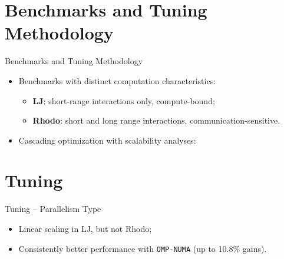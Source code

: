 \documentclass[aspectratio=169, handout]{beamer}
\begin{document}
\section{Benchmarks and Tuning Methodology}

\begin{frame}{Benchmarks and Tuning Methodology}

    \begin{itemize}
        \item Benchmarks with distinct computation characteristics:
        \begin{itemize}
            \item \textbf{LJ}: short-range interactions only, compute-bound;
            \item \textbf{Rhodo}: short and long range interactions, communication-sensitive.
        \end{itemize}
        \vspace{0.5\baselineskip}
        \item Cascading optimization with scalability analyses:
    \end{itemize}

    \begin{center}
    \end{center}
\end{frame}

\section{Tuning}

\begin{frame}{Tuning -- Parallelism Type}
    \begin{center}
        \resizebox{0.95\textwidth}{!}{}
    \end{center}

    \begin{itemize}
        \item Linear scaling in LJ, but not Rhodo;
        \item Consistently better performance with \texttt{OMP-NUMA} (up to 10.8\% gains).
    \end{itemize}
\end{frame}
\end{document}
